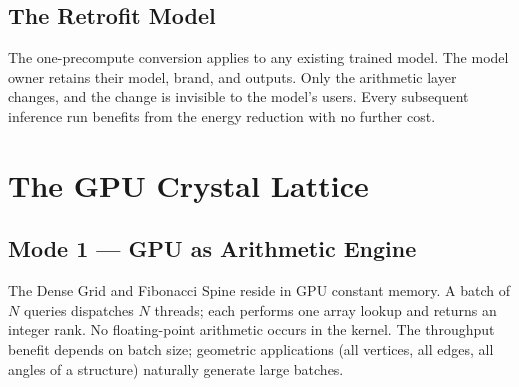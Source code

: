 \documentclass[12pt]{article}
\theoremstyle{definition}
\theoremstyle{remark}
\begin{document}
\subsection{The Retrofit Model}
The one-precompute conversion applies to any existing trained model.
The model owner retains their model, brand, and outputs.  Only the
arithmetic layer changes, and the change is invisible to the model's
users.  Every subsequent inference run benefits from the energy
reduction with no further cost.
\section{The GPU Crystal Lattice}
\label{sec:gpu}
\subsection{Mode 1 --- GPU as Arithmetic Engine}
The Dense Grid and Fibonacci Spine reside in GPU constant memory.
A batch of $N$ queries dispatches $N$ threads; each performs one array
lookup and returns an integer rank.  No floating-point arithmetic occurs
in the kernel.  The throughput benefit depends on batch size; geometric
applications (all vertices, all edges, all angles of a structure)
naturally generate large batches.
\end{document}
